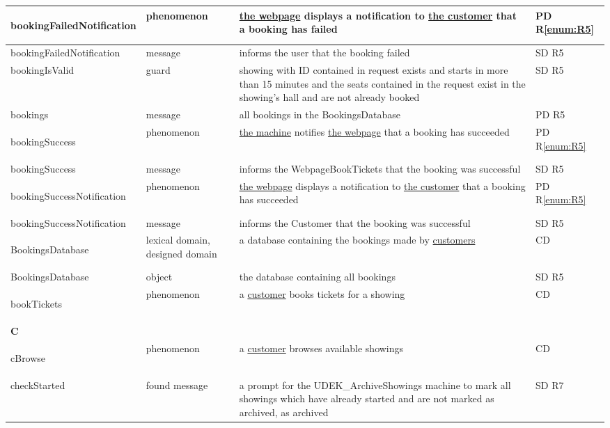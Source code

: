 \documentclass[a4paper,10pt,titlepage,bibtotoc,bibtotocnumbered]{scrreprt}
\begin{document}
\begin{longtable}{|l|p{3cm}|p{5cm}|l|}
\hline
\hypertarget{glossary:bookingFailedNotification}{bookingFailedNotification} & phenomenon & \hyperlink{glossary:WebpageBookTickets}{the webpage} displays a notification to \hyperlink{glossary:Customer}{the customer} that a booking has failed & PD R\ref{enum:R5}\\
\hline
bookingFailedNotification & message & informs the user that the booking failed & SD R5\\
\hline
bookingIsValid & guard & showing with ID contained in request exists and starts in more than 15 minutes and the seats contained in the request exist in the showing's hall and are not already booked & SD R5\\
\hline
bookings & message & all bookings in the BookingsDatabase & PD R5\\
\hline
\hypertarget{glossary:bookingSuccess}{bookingSuccess} & phenomenon & \hyperlink{glossary:UDEKino}{the machine} notifies \hyperlink{glossary:WebpageBookTickets}{the webpage} that a booking has succeeded & PD R\ref{enum:R5}\\
\hline
bookingSuccess & message & informs the WebpageBookTickets that the booking was successful & SD R5\\
\hline
\hypertarget{glossary:bookingSuccessNotification}{bookingSuccessNotification} & phenomenon & \hyperlink{glossary:WebpageBookTickets}{the webpage} displays a notification to \hyperlink{glossary:Customer}{the customer} that a booking has succeeded & PD R\ref{enum:R5}\\
\hline
bookingSuccessNotification & message & informs the Customer that the booking was successful & SD R5\\
\hline
\hypertarget{glossary:BookingsDatabase}{BookingsDatabase} & lexical domain, designed domain & a database containing the bookings made by \hyperlink{glossary:Customer}{customers} & CD\\
\hline
BookingsDatabase & object & the database containing all bookings & SD R5\\
\hline
\hypertarget{glossary:bookTickets}{bookTickets} & phenomenon & a \hyperlink{glossary:Customer}{customer} books tickets for a showing & CD\\
\hline
\multicolumn{4}{|l|}{\textbf{C}}\\
\hline
\hypertarget{glossary:cBrowse}{cBrowse} & phenomenon & a \hyperlink{glossary:Customer}{customer} browses available showings & CD\\
\hline
checkStarted & found message & a prompt for the UDEK\_ArchiveShowings machine to mark all showings which have already started and are not marked as archived, as archived & SD R7\\

\end{longtable}
\end{document}
